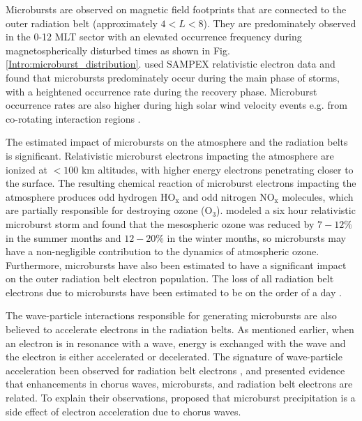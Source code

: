 Microbursts are observed on magnetic field footprints that are connected to the outer radiation belt (approximately $4 < L < 8$). They are predominately observed in the 0-12 MLT sector with an elevated occurrence frequency during magnetospherically disturbed times as shown in Fig. \ref{Intro:microburst_distribution}. \citet{O'Brien2003} used SAMPEX relativistic electron data and found that microbursts predominately occur during the main phase of storms, with a heightened occurrence rate during the recovery phase. Microburst occurrence rates are also higher during high solar wind velocity events e.g. from co-rotating interaction regions \citep{O'Brien2003, Greeley2019}.

The estimated impact of microbursts on the atmosphere and the radiation belts is significant. Relativistic microburst electrons impacting the atmosphere are ionized at $<100$ km altitudes, with higher energy electrons penetrating closer to the surface. The resulting chemical reaction of microburst electrons impacting the atmosphere produces odd hydrogen $\mathrm{HO_x}$ and odd nitrogen $\mathrm{NO_x}$ molecules, which are partially responsible for destroying ozone ($\mathrm{O_3}$). \citet{Seppala2018} modeled a six hour relativistic microburst storm and found that the mesospheric ozone was reduced by $7-12 \%$ in the summer months and $12-20 \%$ in the winter months, so microbursts may have a non-negligible contribution to the dynamics of atmospheric ozone. Furthermore, microbursts have also been estimated to have a significant impact on the outer radiation belt electron population. The loss of all radiation belt electrons due to microbursts have been estimated to be on the order of a day \citep{Lorentzen2001b, O'Brien2004, Thorne2005, Breneman2017, Douma2019}. 

The wave-particle interactions responsible for generating microbursts are also believed to accelerate electrons in the radiation belts. As mentioned earlier, when an electron is in resonance with a wave, energy is exchanged with the wave and the electron is either accelerated or decelerated. The signature of wave-particle acceleration been observed for radiation belt electrons \citep[e.g.][]{Meredith2002, Horne2005, Reeves2013}, and \citet{O'Brien2003} presented evidence that enhancements in chorus waves, microbursts, and radiation belt electrons are related. To explain their observations, \citet{O'Brien2003} proposed that microburst precipitation is a side effect of electron acceleration due to chorus waves. 

